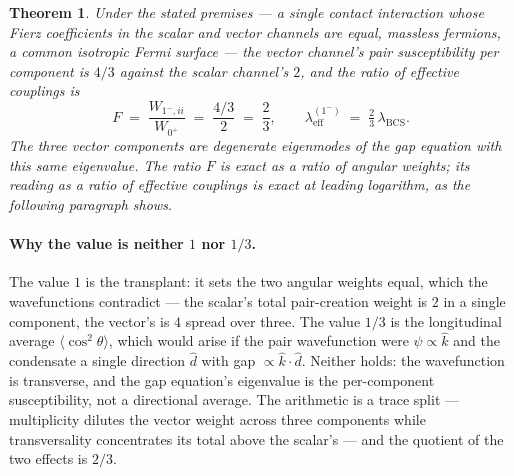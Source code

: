 \documentclass[11pt]{article}
\newtheorem{theorem}{Theorem}
\begin{document}
\begin{theorem}
Under the stated premises --- a single contact interaction whose Fierz coefficients in the scalar and vector channels are equal, massless fermions, a common isotropic Fermi surface --- the vector channel's pair susceptibility per component is $4/3$ against the scalar channel's $2$, and the ratio of effective couplings is
\[
F \;=\; \frac{W_{1^-,ii}}{W_{0^+}} \;=\; \frac{4/3}{2} \;=\; \frac{2}{3},
\qquad \lambda_{\mathrm{eff}}^{(1^-)} \;=\; \tfrac{2}{3}\, \lambda_{\mathrm{BCS}}.
\]
The three vector components are degenerate eigenmodes of the gap equation with this same eigenvalue. The ratio $F$ is exact as a ratio of angular weights; its reading as a ratio of effective couplings is exact at leading logarithm, as the following paragraph shows.
\end{theorem}

\paragraph{Why the value is neither $1$ nor $1/3$.} The value $1$ is the transplant: it sets the two angular weights equal, which the wavefunctions contradict --- the scalar's total pair-creation weight is $2$ in a single component, the vector's is $4$ spread over three. The value $1/3$ is the longitudinal average $\langle \cos^2\theta \rangle$, which would arise if the pair wavefunction were $\psi \propto \hat k$ and the condensate a single direction $\hat d$ with gap $\propto \hat k \cdot \hat d$. Neither holds: the wavefunction is transverse, and the gap equation's eigenvalue is the per-component susceptibility, not a directional average. The arithmetic is a trace split --- multiplicity dilutes the vector weight across three components while transversality concentrates its total above the scalar's --- and the quotient of the two effects is $2/3$.
\end{document}
